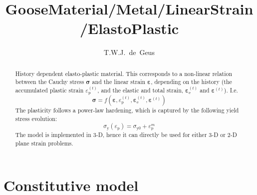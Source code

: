 \documentclass[times,namecite]{goose-article}
\title{%
  GooseMaterial/Metal/LinearStrain/ElastoPlastic
}
\author{T.W.J.~de~Geus}
\begin{document}
\maketitle

\begin{abstract}
History dependent elasto-plastic material. This corresponds to a non-linear relation between the Cauchy stress $\bm{\sigma}$ and the linear strain $\bm{\varepsilon}$, depending on the history (the accumulated plastic strain $\varepsilon_\mathrm{p}^{(t)}$, and the elastic and total strain, $\bm{\varepsilon}^{(t)}_\mathrm{e}$ and $\bm{\varepsilon}^{(t)}$). I.e.
\begin{equation*}
  \bm{\sigma} = f \left( \bm{\varepsilon} , \varepsilon_\mathrm{p}^{(t)} , \bm{\varepsilon}^{(t)}_\mathrm{e} ,\bm{\varepsilon}^{(t)} \right)
\end{equation*}
The plasticity follows a power-law hardening, which is captured by the following yield stress evolution:
\begin{equation*}
  \sigma_\mathrm{y} (\varepsilon_\mathrm{p}) = \sigma_\mathrm{y0} + \varepsilon_\mathrm{p}^m
\end{equation*}
The model is implemented in 3-D, hence it can directly be used for either 3-D or 2-D plane strain problems.
\end{abstract}


\setcounter{tocdepth}{2}
\tableofcontents

\vfill\newpage
\section{Constitutive model}
\end{document}
